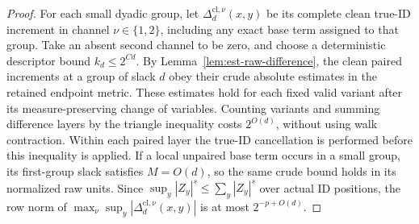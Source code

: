 \begin{proof}
For each small dyadic group, let $\Delta_d^{\mathrm{cl},\nu}(x,y)$ be
its complete clean true-ID increment in channel $\nu\in\{1,2\}$,
including any exact base term assigned to that group.  Take an absent second channel
to be zero, and choose a deterministic descriptor bound $k_d\le2^{Cd}$.
By Lemma~\ref{lem:est-raw-difference}, the clean paired increments at a
group of slack $d$ obey their crude absolute estimates in the retained
endpoint metric.  These estimates hold for each fixed valid variant
after its measure-preserving change of variables.  Counting variants
and summing difference layers by the triangle inequality costs
$2^{O(d)}$, without using walk contraction.  Within each paired layer
the true-ID cancellation is performed before this inequality is
applied.  If a local unpaired base term occurs in a small group, its
first-group slack satisfies $M=O(d)$, so the same crude bound holds in
its normalized raw units.  Since $\sup_y|Z_y|^s\le\sum_y|Z_y|^s$ over actual ID
positions, the row norm of
$\max_\nu\sup_y|\Delta_d^{\mathrm{cl},\nu}(x,y)|$ is at most
$2^{-p+O(d)}$.


\end{proof}
